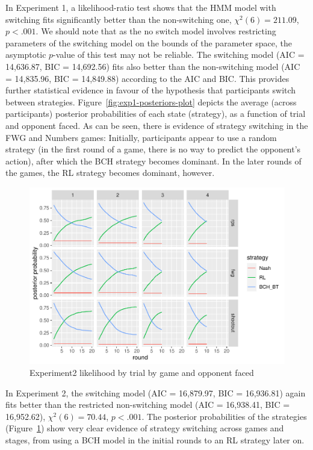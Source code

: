 \documentclass[man,floatsintext]{apa6}
\begin{document}
In Experiment 1, a likelihood-ratio test shows that the HMM model with switching fits significantly better than the non-switching one, \(\chi^2(6) = 211.09\), \(p < .001\). We should note that as the no switch model involves restricting parameters of the switching model on the bounds of the parameter space, the asymptotic \(p\)-value of this test may not be reliable. The switching model (AIC = 14,636.87, BIC = 14,692.56) fits also better than the non-switching model (AIC = 14,835.96, BIC = 14,849.88) according to the AIC and BIC. This provides further statistical evidence in favour of the hypothesis that participants switch between strategies. Figure~\ref{fig:exp1-posteriors-plot} depicts the average (across participants) posterior probabilities of each state (strategy), as a function of trial and opponent faced. As can be seen, there is evidence of strategy switching in the FWG and Numbers games: Initially, participants appear to use a random strategy (in the first round of a game, there is no way to predict the opponent's action), after which the BCH strategy becomes dominant. In the later rounds of the games, the RL strategy becomes dominant, however.

\begin{figure}

{\centering \includegraphics{paper_draft_2021_files/figure-latex/exp2-posteriors-plot-1} 

}

\caption{Experiment2 likelihood by trial by game and opponent faced}\label{fig:exp2-posteriors-plot}
\end{figure}

In Experiment 2, the switching model (AIC = 16,879.97, BIC = 16,936.81) again fits better than the restricted non-switching model (AIC = 16,938.41, BIC = 16,952.62), \(\chi^2(6) = 70.44\), \(p < .001\). The posterior probabilities of the strategies (Figure~\ref{fig:exp2-posteriors-plot}) show very clear evidence of strategy switching across games and stages, from using a BCH model in the initial rounds to an RL strategy later on.
\end{document}
